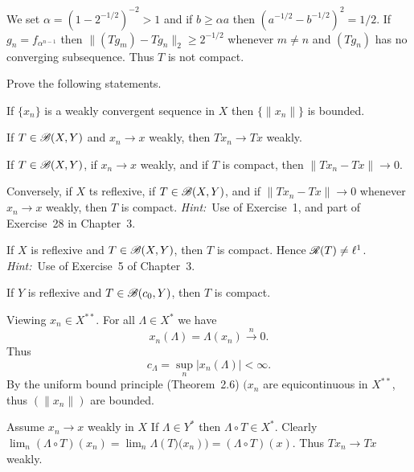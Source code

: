 \begin{enumerate}
We set \(\alpha = (1 - 2^{-1/2})^{-2} > 1\) and if \(b \geq \alpha a\)
then \(\left(a^{-1/2} - b^{-1/2}\right)^2 = 1/2\).
If \(g_n = f_{\alpha^{n-1}}\)
 then \(\|(T g_m) - T g_n\|_2 \geq 2^{-1/2}\) whenever \(m \neq n\)
and \((T g_n)\) has no converging subsequence. Thus $T$ is not compact.

\begin{excopy}
Prove the following statements.

\begin{itemize}

If \(\{x_n\}\) is a weakly convergent sequence in $X$ then \(\{\|x_n\|\}\)
 is bounded.

If \(T \in \mathscr{B}(X,Y)\) and \(x_n \to x\) weakly, then \(Tx_n \to Tx\) weakly.

If \(T \in \mathscr{B}(X,Y)\), if \(x_n \to x\) weakly, and if $T$ is compact,
 then \(\|Tx_n - Tx\| \to 0\).

Conversely, if $X$ ts reflexive, if \(T \in \mathscr{B}(X,Y)\),
 and if \(\|Tx_n - Tx\| \to 0\) whenever
\(x_n \to x\) weakly, then $T$ is compact.
\emph{Hint:}~Use  of Exercise~1, and part  of Exercise~28
 in Chapter~3.

If $X$ is reflexive and \(T \in \mathscr{B}(X,Y)\), then $T$ is compact.
 Hence \(\mathscr{R}(T) \neq \ell^1\).
\emph{Hint:}~Use  of Exercise~5 of Chapter~3.

If $Y$ is reflexive and \(T\in \mathscr{B}(c_0, Y)\), then $T$ is compact.

\end{itemize}

\end{excopy}

\begin{itemize}

Viewing \(x_n \in X^{**}\).
For all \(\Lambda \in X^*\) we have
\begin{equation*}
x_n(\Lambda) = \Lambda(x_n) \stackrel{n}{\rightarrow} 0.
\end{equation*}
Thus 
\begin{equation*}
c_\Lambda = \sup_n \left|x_n(\Lambda)\right| < \infty.
\end{equation*}
By the uniform bound principle (Theorem~2.6)
\((x_n\) are equicontinuous in \(X^{**}\), thus \((\|x_n\|)\) are bounded.

Assume \(x_n\to x\) weakly in $X$
If \(\Lambda \in Y^*\) then \(\Lambda\circ T \in X^*\).
Clearly 
\(\lim_n (\Lambda\circ T)(x_n) 
 = \lim_n \Lambda\left( T)(x_n\right)) = (\Lambda\circ T)(x)\).
Thus \(Tx_n \to Tx\) weakly.


\end{itemize}
\end{enumerate}
